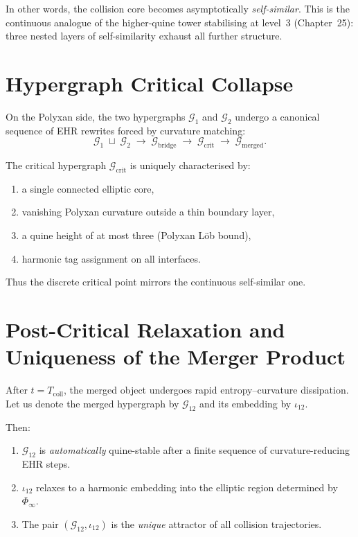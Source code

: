In other words, the collision core becomes asymptotically \emph{self-similar}.  
This is the continuous analogue of the higher-quine tower stabilising at level~3 (Chapter~25):  
three nested layers of self-similarity exhaust all further structure.

\section{Hypergraph Critical Collapse}

On the Polyxan side, the two hypergraphs $\mathcal{G}_1$ and $\mathcal{G}_2$ undergo a canonical sequence of EHR rewrites forced by curvature matching:
\[
\mathcal{G}_1 \;\sqcup\; \mathcal{G}_2
  \;\longrightarrow\;
\mathcal{G}_{\mathrm{bridge}}
  \;\longrightarrow\;
\mathcal{G}_{\mathrm{crit}}
  \;\longrightarrow\;
\mathcal{G}_{\mathrm{merged}}.
\]

The critical hypergraph $\mathcal{G}_{\mathrm{crit}}$ is uniquely characterised by:

\begin{enumerate}
\item a single connected elliptic core,
\item vanishing Polyxan curvature outside a thin boundary layer,
\item a quine height of at most three (Polyxan Löb bound),
\item harmonic tag assignment on all interfaces.
\end{enumerate}

Thus the discrete critical point mirrors the continuous self-similar one.

\section{Post-Critical Relaxation and Uniqueness of the Merger Product}

After $t = T_{\mathrm{coll}}$, the merged object undergoes rapid entropy–curvature dissipation.  
Let us denote the merged hypergraph by $\mathcal{G}_{12}$ and its embedding by $\iota_{12}$.

Then:

\begin{enumerate}
\item $\mathcal{G}_{12}$ is \emph{automatically} quine-stable after a finite sequence of curvature-reducing EHR steps.
\item $\iota_{12}$ relaxes to a harmonic embedding into the elliptic region determined by $\Phi_\infty$.
\item The pair $(\mathcal{G}_{12}, \iota_{12})$ is the \emph{unique} attractor of all collision trajectories.
\end{enumerate}

